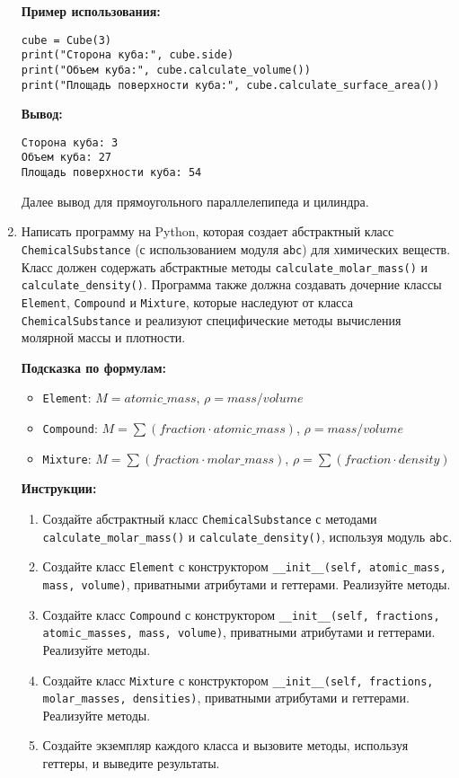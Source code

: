 \begin{enumerate}
\textbf{Пример использования:}
\begin{verbatim}
cube = Cube(3)
print("Сторона куба:", cube.side)
print("Объем куба:", cube.calculate_volume())
print("Площадь поверхности куба:", cube.calculate_surface_area())
\end{verbatim}

\textbf{Вывод:}
\begin{verbatim}
Сторона куба: 3
Объем куба: 27
Площадь поверхности куба: 54
\end{verbatim}

Далее вывод для прямоугольного параллелепипеда и цилиндра.
\item
Написать программу на Python, которая создает абстрактный класс \texttt{ChemicalSubstance} (с использованием модуля \texttt{abc}) для химических веществ. 
Класс должен содержать абстрактные методы \texttt{calculate\_molar\_mass()} и \texttt{calculate\_density()}. 
Программа также должна создавать дочерние классы \texttt{Element}, \texttt{Compound} и \texttt{Mixture}, 
которые наследуют от класса \texttt{ChemicalSubstance} и реализуют специфические методы вычисления молярной массы и плотности.

\textbf{Подсказка по формулам:}
\begin{itemize}
    \item \texttt{Element}: $M = atomic\_mass$, $\rho = mass / volume$
    \item \texttt{Compound}: $M = \sum (fraction \cdot atomic\_mass)$, $\rho = mass / volume$
    \item \texttt{Mixture}: $M = \sum (fraction \cdot molar\_mass)$, $\rho = \sum (fraction \cdot density)$
\end{itemize}

\textbf{Инструкции:}
\begin{enumerate}
    \item Создайте абстрактный класс \texttt{ChemicalSubstance} с методами \texttt{calculate\_molar\_mass()} и \texttt{calculate\_density()}, используя модуль \texttt{abc}.
    \item Создайте класс \texttt{Element} с конструктором \texttt{\_\_init\_\_(self, atomic\_mass, mass, volume)}, приватными атрибутами и геттерами. Реализуйте методы.
    \item Создайте класс \texttt{Compound} с конструктором \texttt{\_\_init\_\_(self, fractions, atomic\_masses, mass, volume)}, приватными атрибутами и геттерами. Реализуйте методы.
    \item Создайте класс \texttt{Mixture} с конструктором \texttt{\_\_init\_\_(self, fractions, molar\_masses, densities)}, приватными атрибутами и геттерами. Реализуйте методы.
    \item Создайте экземпляр каждого класса и вызовите методы, используя геттеры, и выведите результаты.
\end{enumerate}


\end{enumerate}
